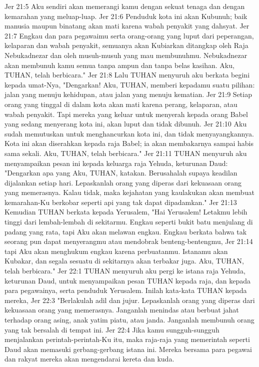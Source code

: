 Jer 21:5  Aku sendiri akan memerangi kamu dengan sekuat tenaga dan dengan kemarahan yang meluap-luap.
Jer 21:6  Penduduk kota ini akan Kubunuh; baik manusia maupun binatang akan mati karena wabah penyakit yang dahsyat.
Jer 21:7  Engkau dan para pegawaimu serta orang-orang yang luput dari peperangan, kelaparan dan wabah penyakit, semuanya akan Kubiarkan ditangkap oleh Raja Nebukadnezar dan oleh musuh-musuh yang mau membunuhmu. Nebukadnezar akan membunuh kamu semua tanpa ampun dan tanpa belas kasihan. Aku, TUHAN, telah berbicara."
Jer 21:8  Lalu TUHAN menyuruh aku berkata begini kepada umat-Nya, "Dengarkan! Aku, TUHAN, memberi kepadamu suatu pilihan: jalan yang menuju kehidupan, atau jalan yang menuju kematian.
Jer 21:9  Setiap orang yang tinggal di dalam kota akan mati karena perang, kelaparan, atau wabah penyakit. Tapi mereka yang keluar untuk menyerah kepada orang Babel yang sedang menyerang kota ini, akan luput dan tidak dibunuh.
Jer 21:10  Aku sudah memutuskan untuk menghancurkan kota ini, dan tidak menyayangkannya. Kota ini akan diserahkan kepada raja Babel; ia akan membakarnya sampai habis sama sekali. Aku, TUHAN, telah berbicara."
Jer 21:11  TUHAN menyuruh aku menyampaikan pesan ini kepada keluarga raja Yehuda, keturunan Daud: "Dengarkan apa yang Aku, TUHAN, katakan. Berusahalah supaya keadilan dijalankan setiap hari. Lepaskanlah orang yang diperas dari kekuasaan orang yang memerasnya. Kalau tidak, maka kejahatan yang kaulakukan akan membuat kemarahan-Ku berkobar seperti api yang tak dapat dipadamkan."
Jer 21:13  Kemudian TUHAN berkata kepada Yerusalem, "Hai Yerusalem! Letakmu lebih tinggi dari lembah-lembah di sekitarmu. Engkau seperti bukit batu menjulang di padang yang rata, tapi Aku akan melawan engkau. Engkau berkata bahwa tak seorang pun dapat menyerangmu atau mendobrak benteng-bentengmu,
Jer 21:14  tapi Aku akan menghukum engkau karena perbuatanmu. Istanamu akan Kubakar, dan segala sesuatu di sekitarnya akan terbakar juga. Aku, TUHAN, telah berbicara."
Jer 22:1  TUHAN menyuruh aku pergi ke istana raja Yehuda, keturunan Daud, untuk menyampaikan pesan TUHAN kepada raja, dan kepada para pegawainya, serta penduduk Yerusalem. Inilah kata-kata TUHAN kepada mereka,
Jer 22:3  "Berlakulah adil dan jujur. Lepaskanlah orang yang diperas dari kekuasaan orang yang memerasnya. Janganlah menindas atau berbuat jahat terhadap orang asing, anak yatim piatu, atau janda. Janganlah membunuh orang yang tak bersalah di tempat ini.
Jer 22:4  Jika kamu sungguh-sungguh menjalankan perintah-perintah-Ku itu, maka raja-raja yang memerintah seperti Daud akan memasuki gerbang-gerbang istana ini. Mereka bersama para pegawai dan rakyat mereka akan mengendarai kereta dan kuda.
